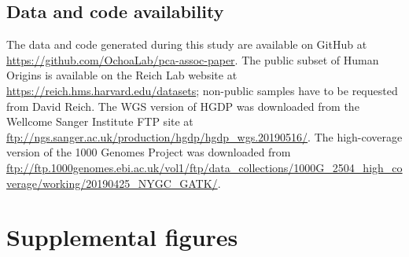 \documentclass[11pt]{article}
\newcommand{\beginsupplement}{%
  \setcounter{table}{0}
  \renewcommand{\thetable}{S\arabic{table}}%
  \setcounter{figure}{0}
  \renewcommand{\thefigure}{S\arabic{figure}}%
  \setcounter{section}{0}
  \renewcommand{\thesection}{S\arabic{section}}%
  \setcounter{equation}{0}
  \renewcommand{\theequation}{S\arabic{equation}}%
  \setcounter{page}{1}
  \renewcommand{\thepage}{S\arabic{page}}%
}
\begin{document}
\begin{linenumbers}
\section*{Data and code availability}
The data and code generated during this study are available on GitHub at \url{https://github.com/OchoaLab/pca-assoc-paper}.
The public subset of Human Origins is available on the Reich Lab website at \url{https://reich.hms.harvard.edu/datasets}; non-public samples have to be requested from David Reich.
The WGS version of HGDP was downloaded from the Wellcome Sanger Institute FTP site at \url{ftp://ngs.sanger.ac.uk/production/hgdp/hgdp_wgs.20190516/}.
The high-coverage version of the 1000 Genomes Project was downloaded from \url{ftp://ftp.1000genomes.ebi.ac.uk/vol1/ftp/data_collections/1000G_2504_high_coverage/working/20190425_NYGC_GATK/}.

\printbibliography

\end{linenumbers}



\clearpage

\beginsupplement

\section*{Supplemental figures}
\end{document}
